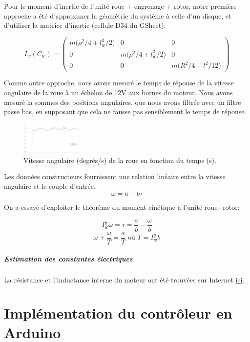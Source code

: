 \documentclass{report}
\begin{document}
Pour le moment d'inertie de l'unité roue + engrenage + rotor, 
notre première approche a été d'approximer la géométrie du système à celle d'un disque,
et d'utiliser la matrice d'inertie (cellule D34 du GSheet):

\begin{equation*}
    I_w(C_w) = 
    \begin{pmatrix}
        m \big(\rho^2/4 + l_w^2/2 \big) & 0 & 0 \\
        0 & m \big(\rho^2/4 + l_w^2/2 \big) & 0 \\
        0 & 0 & m \big(R^2/4 + l^2/12 \big)
    \end{pmatrix}
\end{equation*}

Comme autre approche, nous avons mesuré le temps de réponse de la 
vitesse angulaire de la roue à un échelon de 12V aux bornes du moteur.
Nous avons mesuré la sommes des positions angulaires, que nous avons filtrée 
avec un filtre passe bas, en supposant que cela ne fausse pas sensiblement le 
temps de réponse.

\begin{figure}[h]  %
    \centering
    \includegraphics[width=3cm]{figures/inertie_roue.png}
    \caption{Vitesse angulaire (degrés/s) de la roue en fonction du temps (s).}
\end{figure}

Les données constructeurs fournissent une relation 
linéaire entre la vitesse angulaire et le couple d'entrée. $$\omega = a - b\tau$$

On a essayé d'exploiter le théorème du moment cinétique à l'unité roue+rotor:

$$I_w^y\dot{\omega} = \tau = \frac{a}{b} - \frac{\omega}{b}$$
$$\dot{\omega} +  \frac{\omega}{T} = \frac{a}{T} \text{  où  } T=I_w^yb$$


\paragraph{Estimation des constantes électriques}
La résistance et l'inductance interne du moteur ont été trouvées sur Internet 
\href{https://forum.pololu.com/t/mechanics-and-electrical-parameters/18153/2}{ici}.

\chapter{Implémentation du contrôleur en Arduino}
\end{document}
